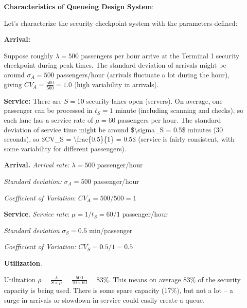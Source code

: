 \documentclass[
  letterpaper,
  DIV=11,
  numbers=noendperiod]{scrartcl}
\begin{document}
\begin{tcolorbox}[enhanced jigsaw, colbacktitle=quarto-callout-note-color!10!white, leftrule=.75mm, breakable, bottomtitle=1mm, title=\textcolor{quarto-callout-note-color}{\faInfo}\hspace{0.5em}{At the Airport- Barcelona Prat}, opacitybacktitle=0.6, toptitle=1mm, arc=.35mm, colback=white, rightrule=.15mm, left=2mm, colframe=quarto-callout-note-color-frame, titlerule=0mm, toprule=.15mm, bottomrule=.15mm, opacityback=0, coltitle=black]

\textbf{Characteristics of Queueing Design System}:

Let's characterize the security checkpoint system with the parameters
defined:

\textbf{Arrival:}

Suppose roughly \(\lambda= 500\) passengers per hour arrive at the
Terminal 1 security checkpoint during peak times. The standard deviation
of arrivals might be around \(\sigma_A= 500\) passengers/hour (arrivals
fluctuate a lot during the hour), giving
\(CV_A = \frac{500}{500} = 1.0\) (high variability in arrivals).

\textbf{Service:} There are \(S = 10\) security lanes open (servers). On
average, one passenger can be processed in \(t_S = 1\) minute (including
scanning and checks), so each lane has a service rate of \(\mu = 60\)
passengers per hour. The standard deviation of service time might be
around \$\textbackslash sigma\_S = 0.5\$ minutes (30 seconds), so
\$CV\_S = \textbackslash frac\{0.5\}\{1\} = 0.5\$ (service is fairly
consistent, with some variability for different passengers).

\textbf{Arrival.} \emph{Arrival rate:} \(\lambda=500\) passenger/hour

\emph{Standard deviation:} \(\sigma_A=500\) passenger/hour

\emph{Coefficient of Variation}: \(CV_A=500/500=1\)

\textbf{Service}. \emph{Service rate}: \(\mu=1/t_S=60/1\) passenger/hour

\emph{Standard deviation} \(σ_S=0.5\) min/passenger

\emph{Coefficient of Variation:} \(CV_S=0.5/1=0.5\)

\textbf{Utilization}.

Utilization \(\rho=\frac{λ}{S×μ}=\frac{500}{10\times 60}=83\%\). This
means on average \(83\%\) of the security capacity is being used. There
is some spare capacity (17\%), but not a lot -- a surge in arrivals or
slowdown in service could easily create a queue.

\end{tcolorbox}
\end{document}
